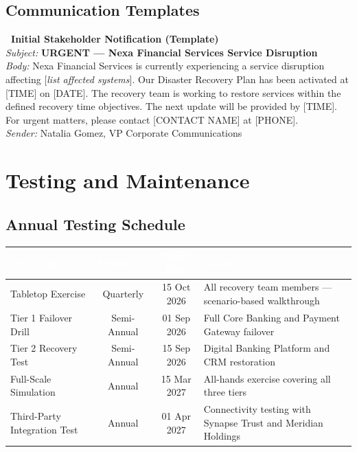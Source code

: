\documentclass[a4paper,11pt]{article}
\begin{document}
\subsection{Communication Templates}

\begin{infobox}
\textbf{\faBullhorn\ Initial Stakeholder Notification (Template)}\\[4pt]
\textit{Subject:} \textbf{URGENT --- Nexa Financial Services Service Disruption}\\[4pt]
\textit{Body:} Nexa Financial Services is currently experiencing a service disruption affecting [\textit{list affected systems}]. Our Disaster Recovery Plan has been activated at [TIME] on [DATE]. The recovery team is working to restore services within the defined recovery time objectives. The next update will be provided by [TIME]. For urgent matters, please contact [CONTACT NAME] at [PHONE].\\[4pt]
\textit{Sender:} Natalia Gomez, VP Corporate Communications
\end{infobox}

\section{Testing and Maintenance}

\subsection{Annual Testing Schedule}

\begin{tabularx}{\textwidth}{@{}l c c X@{}}
  \toprule
  \rowcolor{tablehead}
  \textcolor{white}{\textbf{Test Type}} & \textcolor{white}{\textbf{Frequency}} & \textcolor{white}{\textbf{Next Date}} & \textcolor{white}{\textbf{Scope}}\\
  \midrule
  Tabletop Exercise & Quarterly & 15 Oct 2026 & All recovery team members --- scenario-based walkthrough\\
  \rowcolor{tablerow}
  Tier 1 Failover Drill & Semi-Annual & 01 Sep 2026 & Full Core Banking and Payment Gateway failover\\
  Tier 2 Recovery Test & Semi-Annual & 15 Sep 2026 & Digital Banking Platform and CRM restoration\\
  \rowcolor{tablerow}
  Full-Scale Simulation & Annual & 15 Mar 2027 & All-hands exercise covering all three tiers\\
  Third-Party Integration Test & Annual & 01 Apr 2027 & Connectivity testing with Synapse Trust and Meridian Holdings\\
  \bottomrule
\end{tabularx}
\end{document}

